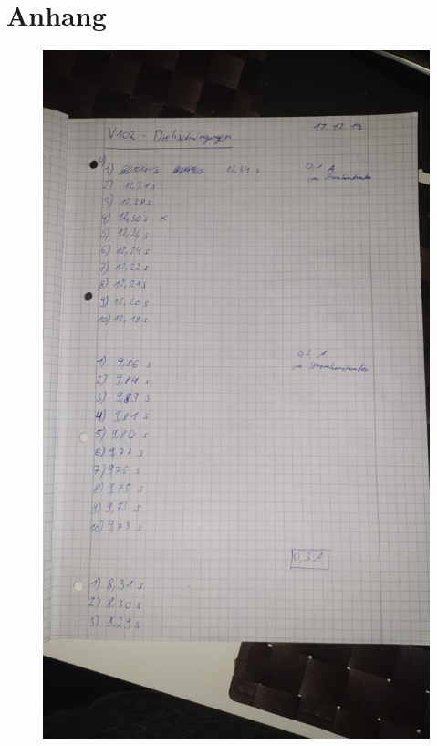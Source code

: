 \newpage
\section{Anhang}
\label{sec:anhang}

\begin{figure}
    \centering
    \includegraphics[scale=0.1]{content/Bilder/daten1.jpg}
\end{figure}

